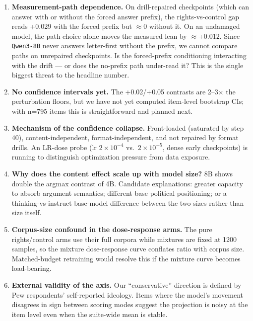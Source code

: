 \documentclass[11pt]{article}
\begin{document}
\begin{enumerate}
  \item \textbf{Measurement-path dependence.} On drill-repaired checkpoints (which
        can answer with or without the forced answer prefix), the rights-vs-control
        gap reads +0.029 with the forced prefix but $\approx$0 without it. On an
        undamaged model, the path choice alone moves the measured lean by
        $\approx$+0.012. Since \texttt{Qwen3-8B} never answers letter-first without
        the prefix, we cannot compare paths on unrepaired checkpoints. Is the
        forced-prefix conditioning interacting with the drift --- or does the
        no-prefix path under-read it? This is the single biggest threat to the
        headline number.
  \item \textbf{No confidence intervals yet.} The +0.02/+0.05 contrasts are
        2--3$\times$ the perturbation floors, but we have not yet computed
        item-level bootstrap CIs; with n=795 items this is straightforward and
        planned next.
  \item \textbf{Mechanism of the confidence collapse.} Front-loaded (saturated by
        step 40), content-independent, format-independent, and not repaired by
        format drills. An LR-dose probe (lr $2\times10^{-4}$ vs.\ $2\times10^{-5}$,
        dense early checkpoints) is running to distinguish optimization pressure
        from data exposure.
  \item \textbf{Why does the content effect scale up with model size?} 8B shows
        double the argmax contrast of 4B. Candidate explanations: greater capacity
        to absorb argument semantics; different base political positioning; or a
        thinking-vs-instruct base-model difference between the two sizes rather
        than size itself.
  \item \textbf{Corpus-size confound in the dose-response arms.} The pure
        rights/control arms use their full corpora while mixtures are fixed at
        1200 samples, so the mixture dose-response curve conflates ratio with
        corpus size. Matched-budget retraining would resolve this if the mixture
        curve becomes load-bearing.
  \item \textbf{External validity of the axis.} Our ``conservative'' direction is
        defined by Pew respondents' self-reported ideology. Items where the model's
        movement disagrees in sign between scoring modes suggest the projection is
        noisy at the item level even when the suite-wide mean is stable.
\end{enumerate}
\end{document}
